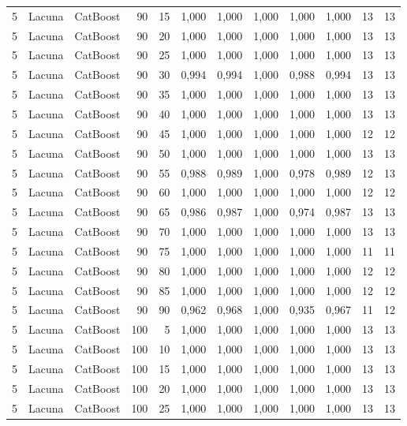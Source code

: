\begin{longtable}{@{}rllrrrrrrrrr@{}}
5 & Lacuna & CatBoost & 90 & 15 & 1,000 & 1,000 & 1,000 & 1,000 & 1,000 & 13 & 13 \\
5 & Lacuna & CatBoost & 90 & 20 & 1,000 & 1,000 & 1,000 & 1,000 & 1,000 & 13 & 13 \\
5 & Lacuna & CatBoost & 90 & 25 & 1,000 & 1,000 & 1,000 & 1,000 & 1,000 & 13 & 13 \\
5 & Lacuna & CatBoost & 90 & 30 & 0,994 & 0,994 & 1,000 & 0,988 & 0,994 & 13 & 13 \\
5 & Lacuna & CatBoost & 90 & 35 & 1,000 & 1,000 & 1,000 & 1,000 & 1,000 & 13 & 13 \\
5 & Lacuna & CatBoost & 90 & 40 & 1,000 & 1,000 & 1,000 & 1,000 & 1,000 & 13 & 13 \\
5 & Lacuna & CatBoost & 90 & 45 & 1,000 & 1,000 & 1,000 & 1,000 & 1,000 & 12 & 12 \\
5 & Lacuna & CatBoost & 90 & 50 & 1,000 & 1,000 & 1,000 & 1,000 & 1,000 & 13 & 13 \\
5 & Lacuna & CatBoost & 90 & 55 & 0,988 & 0,989 & 1,000 & 0,978 & 0,989 & 12 & 13 \\
5 & Lacuna & CatBoost & 90 & 60 & 1,000 & 1,000 & 1,000 & 1,000 & 1,000 & 12 & 12 \\
5 & Lacuna & CatBoost & 90 & 65 & 0,986 & 0,987 & 1,000 & 0,974 & 0,987 & 13 & 13 \\
5 & Lacuna & CatBoost & 90 & 70 & 1,000 & 1,000 & 1,000 & 1,000 & 1,000 & 13 & 13 \\
5 & Lacuna & CatBoost & 90 & 75 & 1,000 & 1,000 & 1,000 & 1,000 & 1,000 & 11 & 11 \\
5 & Lacuna & CatBoost & 90 & 80 & 1,000 & 1,000 & 1,000 & 1,000 & 1,000 & 12 & 12 \\
5 & Lacuna & CatBoost & 90 & 85 & 1,000 & 1,000 & 1,000 & 1,000 & 1,000 & 12 & 12 \\
5 & Lacuna & CatBoost & 90 & 90 & 0,962 & 0,968 & 1,000 & 0,935 & 0,967 & 11 & 12 \\
5 & Lacuna & CatBoost & 100 & 5 & 1,000 & 1,000 & 1,000 & 1,000 & 1,000 & 13 & 13 \\
5 & Lacuna & CatBoost & 100 & 10 & 1,000 & 1,000 & 1,000 & 1,000 & 1,000 & 13 & 13 \\
5 & Lacuna & CatBoost & 100 & 15 & 1,000 & 1,000 & 1,000 & 1,000 & 1,000 & 13 & 13 \\
5 & Lacuna & CatBoost & 100 & 20 & 1,000 & 1,000 & 1,000 & 1,000 & 1,000 & 13 & 13 \\
5 & Lacuna & CatBoost & 100 & 25 & 1,000 & 1,000 & 1,000 & 1,000 & 1,000 & 13 & 13 \\

\end{longtable}
